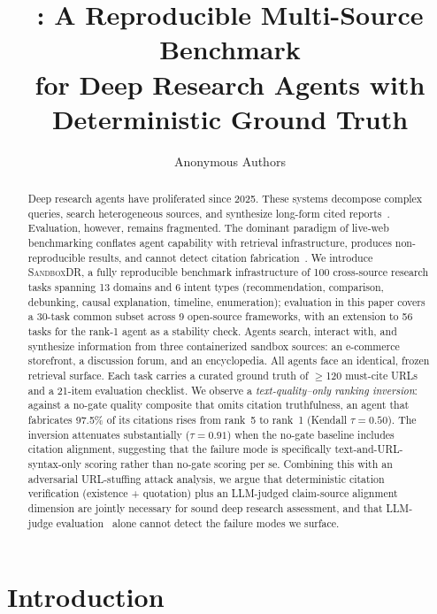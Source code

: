 \documentclass{article}
\title{\ours{}: A Reproducible Multi-Source Benchmark\\for Deep Research Agents with Deterministic Ground Truth}
\author{Anonymous Authors}
\newcommand{\ours}{\textsc{SandboxDR}}
\begin{document}
\maketitle

\begin{abstract}
Deep research agents have proliferated since 2025. These systems decompose complex queries, search heterogeneous sources, and synthesize long-form cited reports~\citep{drsurvey2025}. Evaluation, however, remains fragmented. The dominant paradigm of live-web benchmarking conflates agent capability with retrieval infrastructure, produces non-reproducible results, and cannot detect citation fabrication~\citep{browsecomp_plus2025,liu2023verifiability}. We introduce \ours{}, a fully reproducible benchmark infrastructure of 100 cross-source research tasks spanning 13 domains and 6 intent types (recommendation, comparison, debunking, causal explanation, timeline, enumeration); evaluation in this paper covers a 30-task common subset across 9 open-source frameworks, with an extension to 56 tasks for the rank-1 agent as a stability check. Agents search, interact with, and synthesize information from three containerized sandbox sources: an e-commerce storefront, a discussion forum, and an encyclopedia. All agents face an identical, frozen retrieval surface. Each task carries a curated ground truth of $\geq$120 must-cite URLs and a 21-item evaluation checklist. We observe a \emph{text-quality--only ranking inversion}: against a no-gate quality composite that omits citation truthfulness, an agent that fabricates 97.5\% of its citations rises from rank~5 to rank~1 (Kendall $\tau{=}0.50$). The inversion attenuates substantially ($\tau{=}0.91$) when the no-gate baseline includes citation alignment, suggesting that the failure mode is specifically text-and-URL-syntax-only scoring rather than no-gate scoring per se. Combining this with an adversarial URL-stuffing attack analysis, we argue that deterministic citation verification (existence + quotation) plus an LLM-judged claim-source alignment dimension are jointly necessary for sound deep research assessment, and that LLM-judge evaluation~\citep{llmjudge2024} alone cannot detect the failure modes we surface.
\end{abstract}

\section{Introduction}
\label{sec:intro}
\end{document}
